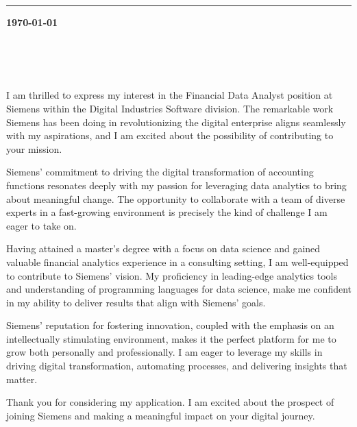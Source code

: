 \documentclass{cover_class}
\begin{document}
\hfill
{}
\vspace{12pt}
\hrule
\vspace{12pt}

\noindent\textbf{\today}
\vspace{1em}

\\
\\
\\

\begin{spacing}{1.4}


\vspace{6pt}

I am thrilled to express my interest in the Financial Data Analyst position at Siemens within the Digital Industries Software division. The remarkable work Siemens has been doing in revolutionizing the digital enterprise aligns seamlessly with my aspirations, and I am excited about the possibility of contributing to your mission.

\vspace{6pt}

Siemens' commitment to driving the digital transformation of accounting functions resonates deeply with my passion for leveraging data analytics to bring about meaningful change. The opportunity to collaborate with a team of diverse experts in a fast-growing environment is precisely the kind of challenge I am eager to take on.

\vspace{6pt}

Having attained a master's degree with a focus on data science and gained valuable financial analytics experience in a consulting setting, I am well-equipped to contribute to Siemens' vision. My proficiency in leading-edge analytics tools and understanding of programming languages for data science, make me confident in my ability to deliver results that align with Siemens' goals.

\vspace{6pt}

Siemens' reputation for fostering innovation, coupled with the emphasis on an intellectually stimulating environment, makes it the perfect platform for me to grow both personally and professionally. I am eager to leverage my skills in driving digital transformation, automating processes, and delivering insights that matter.

\vspace{6pt}

Thank you for considering my application. I am excited about the prospect of joining Siemens and making a meaningful impact on your digital journey.

\vspace{6pt}

\vspace{6pt}
\end{spacing}
\end{document}
